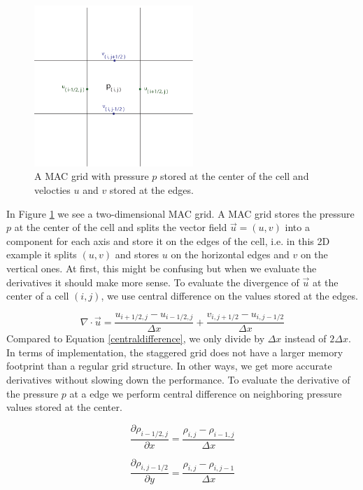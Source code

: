 \begin{figure}[ht!]
\centering
\includegraphics[width=60mm]{img/mac2.pdf}
\caption{A MAC grid with pressure $p$ stored at the center of the cell and velocties $u$ and $v$ stored at the edges.}
\label{macgrid}
\end{figure}
\noindent
In Figure \ref{macgrid} we see a two-dimensional MAC grid. A MAC grid stores the pressure $p$ at the center of the cell and splits the vector field $\vec{u} = (u,v)$ into a component for each axis and store it on the edges of the cell, i.e. in this 2D example it splits $(u,v)$ and stores $u$ on the horizontal edges and $v$ on the vertical ones. At first, this might be confusing but when we evaluate the derivatives it should make more sense. To evaluate the divergence of $\vec{u}$ at the center of a cell $(i,j)$, we use central difference on the values stored at the edges.

\begin{equation}
\nabla \cdot \vec{u} = \frac{u_{i+1/2,j} - u_{i-1/2,j}}{\Delta x} + 
                       \frac{v_{i,j+1/2} - u_{i,j-1/2}}{\Delta x}
\end{equation}
\noindent
Compared to Equation \ref{centraldifference}, we only divide by $\Delta x$ instead of $2\Delta x$. In terms of implementation, the staggered grid does not have a larger memory footprint than a regular grid structure. In other ways, we get more accurate derivatives without slowing down the performance. To evaluate the derivative of the pressure $p$ at a edge we perform central difference on neighboring pressure values stored at the center.

\begin{equation}
\frac{\partial \rho_{i-1/2,j}}{\partial x} = \frac{\rho_{i,j} - \rho_{i-1,j}}{\Delta x}
\end{equation}

\begin{equation}
\frac{\partial \rho_{i,j-1/2}}{\partial y} = \frac{\rho_{i,j} - \rho_{i,j-1}}{\Delta x}
\end{equation}
